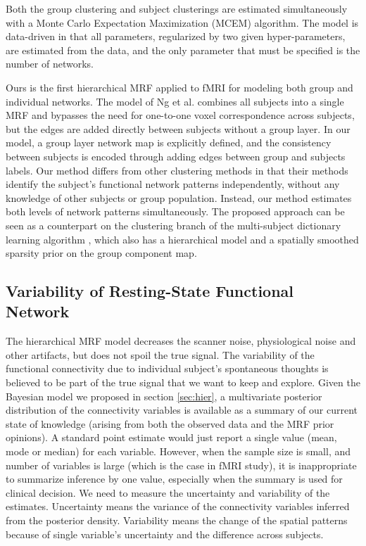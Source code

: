 \documentclass[12pt]{article}
\begin{document}
Both the group clustering and subject clusterings are estimated simultaneously
with a Monte Carlo Expectation Maximization (MCEM) algorithm.  The model is
data-driven in that all parameters, regularized by two given hyper-parameters,
are estimated from the data, and the only parameter that must be specified is
the number of networks.

Ours is the first hierarchical MRF applied to fMRI for modeling both
group and individual networks. The model of Ng et al. \cite{ng2010group}
combines all subjects into a single MRF and bypasses the need for one-to-one
voxel correspondence across subjects, but the edges are added directly between
subjects without a group layer. In our model, a group layer network map is
explicitly defined, and the consistency between subjects is encoded through
adding edges between group and subjects labels. Our method differs from other
clustering methods \cite{bellec2010multi,van2008normalized} in that their
methods identify the subject's functional network patterns independently,
without any knowledge of other subjects or group population. Instead, our method
estimates both levels of network patterns simultaneously.  The proposed approach
can be seen as a counterpart on the clustering branch of the multi-subject
dictionary learning algorithm \cite{varoquaux2011multi}, which also has a
hierarchical model and a spatially smoothed sparsity prior on the group
component map.

\subsection{Variability of Resting-State Functional Network}
The hierarchical MRF model decreases the scanner noise, physiological noise and
other artifacts, but does not spoil the true signal. The variability of the
functional connectivity due to individual subject's spontaneous thoughts is
believed to be part of the true signal that we want to keep and explore. Given
the Bayesian model we proposed in section \ref{sec:hier}, a multivariate
posterior distribution of the connectivity variables is available as a summary
of our current state of knowledge (arising from both the observed data and the
MRF prior opinions). A standard point estimate would just report a single value
(mean, mode or median) for each variable. However, when the sample size is
small, and number of variables is large (which is the case in fMRI study), it is
inappropriate to summarize inference by one value, especially when the summary
is used for clinical decision. We need to measure the uncertainty and
variability of the estimates. Uncertainty means the variance of the connectivity
variables inferred from the posterior density. Variability means the change of
the spatial patterns because of single variable's uncertainty and the difference
across subjects.
\end{document}
